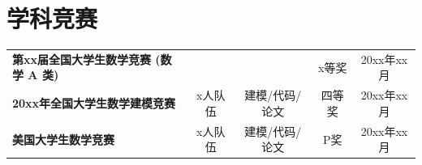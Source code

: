 \documentclass[11pt]{article}
\newlength{\iconwidth}
\begin{document}
    \hfill
    \begin{minipage}[t]{0.2\textwidth}
        \vspace{2em} %
        \setlength{\fboxsep}{0pt}
    \end{minipage}
    
    \begin{minipage}[t]{\textwidth}
    \section[学科竞赛]{\makebox[\iconwidth][c]{\color{primary_color}{\faAtom}}\quad 学科竞赛}
         \begin{tabular}{l c c c c}
             \textbf{第xx届全国大学生数学竞赛 (数学 A 类)} &  &  & x等奖 & 20xx年xx月 \\
             \textbf{20xx年全国大学生数学建模竞赛} & x人队伍 & 建模/代码/论文& 四等奖 & 20xx年xx月\\
             \textbf{美国大学生数学竞赛} & x人队伍 & 建模/代码/论文 & P奖 & 20xx年xx月\\
         \end{tabular}
     \end{minipage}
\end{document}
